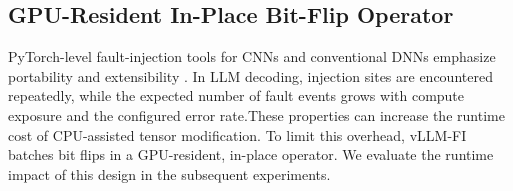 













\subsection{GPU-Resident In-Place Bit-Flip Operator}
\label{subsec:cuda_operator}

PyTorch-level fault-injection tools for CNNs and conventional DNNs
emphasize portability and extensibility
\cite{mahmoud2020pytorchfi,huang2024mrfi}. In LLM decoding, injection sites are encountered repeatedly, while the expected number of fault events grows with compute exposure and the configured error rate.These properties can increase the runtime cost of CPU-assisted tensor modification. To limit this overhead, vLLM-FI batches bit flips in a
GPU-resident, in-place operator. We evaluate the runtime impact of this design in the subsequent experiments.

